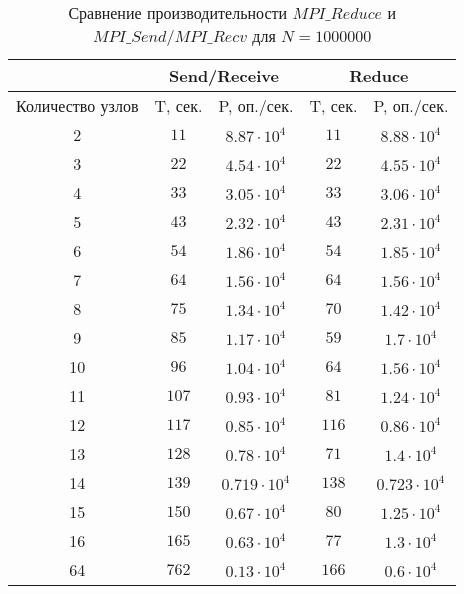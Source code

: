 			\begin{table}
				\caption{Сравнение производительности $ MPI\_Reduce $ и $ MPI\_Send / MPI\_Recv $ для $ N = 1000000$}
				\label{talbe:reduce}
				\begin{tabular}{|c|c|c|c|c|}
					\hline 
					& \multicolumn{2}{c|}{Send/Receive}  & \multicolumn{2}{c|}{Reduce} \\ 
					\hline 
					\multicolumn{1}{|m{2.5cm}|}{Количество узлов} & T, сек. & P, оп./сек. & T, сек. & P, оп./сек. \\ 
					\hline 
					2 & $11 $ & $ 8.87 \cdot 10^4 $ & $ 11 $ & $ 8.88 \cdot 10^4 $ \\ 
					\hline 
					3 & $22 $ & $ 4.54 \cdot 10^4 $ & $ 22 $ & $ 4.55 \cdot 10^4 $ \\ 
					\hline 
					4 & $33 $ & $ 3.05 \cdot 10^4 $ & $ 33 $ & $ 3.06 \cdot 10^4 $ \\ 
					\hline 
					5 & $43 $ & $ 2.32 \cdot 10^4 $ & $ 43 $ & $ 2.31 \cdot 10^4 $ \\ 
					\hline 
					6 & $ 54 $ & $ 1.86 \cdot 10^4 $ & $ 54 $ & $ 1.85 \cdot 10^4 $ \\ 
					\hline 
					7 & $ 64 $ & $ 1.56 \cdot 10^4 $ & $ 64 $ & $ 1.56 \cdot 10^4 $ \\ 
					\hline 
					8 & $ 75 $ & $ 1.34 \cdot 10^4 $ & $ 70 $ & $ 1.42 \cdot 10^4 $ \\ 
					\hline 
					9 & $ 85 $ & $ 1.17 \cdot 10^4 $ & $ 59 $ & $ 1.7 \cdot 10^4 $ \\ 
					\hline 
					10 & $ 96 $ & $ 1.04 \cdot 10^4 $ & $ 64 $ & $ 1.56 \cdot 10^4 $ \\ 
					\hline
					11 & $ 107 $ & $ 0.93 \cdot 10^4 $ & $ 81 $ & $ 1.24 \cdot 10^4 $ \\ 
					\hline 
					12 & $ 117 $ & $ 0.85 \cdot 10^4 $ & $ 116 $ & $ 0.86 \cdot 10^4 $ \\ 
					\hline 
					13 & $ 128 $ & $ 0.78 \cdot 10^4 $ & $ 71 $ & $ 1.4 \cdot 10^4 $ \\ 
					\hline 
					14 & $ 139 $ & $ 0.719 \cdot 10^4 $ & $ 138 $ & $ 0.723 \cdot 10^4 $ \\ 
					\hline 
					15 & $ 150 $ & $ 0.67 \cdot 10^4 $ & $ 80 $ & $ 1.25 \cdot 10^4 $ \\ 
					\hline 
					16 & $ 165 $ & $ 0.63 \cdot 10^4 $ & $ 77 $ & $ 1.3 \cdot 10^4 $ \\ 
					\hline 
					64 & $ 762 $ & $ 0.13 \cdot 10^4 $ & $ 166 $ & $ 0.6 \cdot 10^4 $ \\ 
					\hline 
				\end{tabular} 
			\end{table}
			
